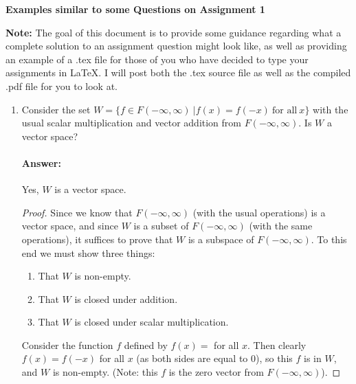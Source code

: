 \documentclass[12pt]{article}
\begin{document}
\thispagestyle{empty}

\begin{center}
        \textbf{Examples similar to some Questions on Assignment 1}\\
\end{center}

{\bf Note:} The goal of this document is to provide some guidance regarding what a complete solution to an assignment question might look like, as well as providing an example of a .tex file for those of you who have decided to type your assignments in \LaTeX. I will post both the .tex source file as well as the compiled .pdf file for you to look at.

\begin{enumerate}
        \item Consider the set $W = \{f \in F(-\infty, \infty) \ | f(x) = f(-x) \ \textrm{for all} \ x \}$ with the usual scalar multiplication and vector addition from $F(-\infty, \infty)$. Is $W$ a vector space?
              \paragraph{Answer:} Yes, $W$ is a vector space.
              \begin{proof}
                      Since we know that $F(-\infty, \infty)$ (with the usual operations) is a vector space, and since $W$ is a subset of $F(-\infty, \infty)$ (with the same operations), it suffices to prove that $W$ is a subspace of $F(-\infty, \infty)$. To this end we must show three things:
                      \begin{enumerate}
                              \item That $W$ is non-empty.
                              \item That $W$ is closed under addition.
                              \item That $W$ is closed under scalar multiplication.
                      \end{enumerate}
                      Consider the function $f$ defined by $f(x) = $ for all $x$. Then clearly $f(x) = f(-x)$ for all $x$ (as both sides are equal to 0), so this $f$ is in $W$, and $W$ is non-empty. (Note: this $f$ is the zero vector from $F(-\infty, \infty)$).


\end{proof}
\end{enumerate}
\end{document}
